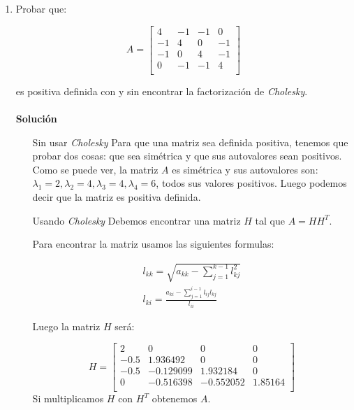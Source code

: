 \begin{enumerate}
    \item Probar que:
    
    \[
        A = \begin{bmatrix}
            4 & -1 & -1 & 0\\
            -1 & 4 & 0 & -1\\
            -1 & 0 & 4 & -1\\
            0 & -1 & -1 & 4\\
        \end{bmatrix}
    \]
    
    es positiva definida con y sin encontrar la factorización de \textit{Cholesky}.\\\\
    
    \textbf{Solución}\\
    
    \begin{itemize}
        \item[Sin usar \textit{Cholesky}] Para que una matriz sea definida positiva, tenemos que probar dos cosas: que sea simétrica y que sus autovalores sean positivos. Como se puede ver, la matriz $A$ es simétrica y sus autovalores son: $\lambda_1 = 2, \lambda_2 = 4, \lambda_3 = 4, \lambda_4 = 6$, todos sus valores positivos. Luego podemos decir que la matriz es positiva definida.
        
        \item[Usando \textit{Cholesky}] Debemos encontrar una matriz $H$ tal que $A = H H^T$.
        
        Para encontrar la matriz usamos las siguientes formulas:
        
        \begin{equation*}
            \begin{split}
                l_{kk} = \sqrt{a_{kk} - \sum_{j=1}^{k-1} l_{kj} ^ 2}\\
                l_{ki} = \frac{a_{ki} - \sum_{j=1}^{i-1} l_{ij} l_{kj} }{l_{ii}}
            \end{split}
        \end{equation*}
        
        Luego la matriz $H$ será:
        
        \[
        H = \begin{bmatrix}
            2 & 0 & 0 & 0\\
            -0.5 & 1.936492 & 0 & 0\\
            -0.5 & -0.129099 & 1.932184 & 0 \\
            0 & -0.516398 & -0.552052 & 1.85164\\
        \end{bmatrix}
        \]
    Si multiplicamos $H$ con $H^T$ obtenemos $A$.
        

\end{itemize}
\end{enumerate}
